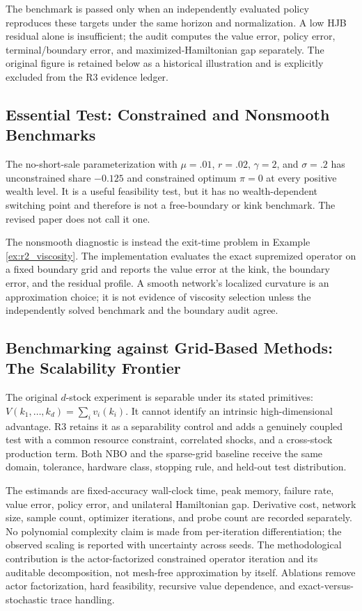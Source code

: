 \documentclass[ecta]{econsocart}
\theoremstyle{plain}
\theoremstyle{remark}
\begin{document}
The benchmark is passed only when an independently evaluated policy reproduces these targets under the same horizon and normalization. A low HJB residual alone is insufficient; the audit computes the value error, policy error, terminal/boundary error, and maximized-Hamiltonian gap separately. The original figure is retained below as a historical illustration and is explicitly excluded from the R3 evidence ledger.

\subsection{Essential Test: Constrained and Nonsmooth Benchmarks}
The no-short-sale parameterization with $\mu=.01$, $r=.02$, $\gamma=2$, and $\sigma=.2$ has unconstrained share $-0.125$ and constrained optimum $\pi=0$ at every positive wealth level. It is a useful feasibility test, but it has no wealth-dependent switching point and therefore is not a free-boundary or kink benchmark. The revised paper does not call it one.

The nonsmooth diagnostic is instead the exit-time problem in Example \ref{ex:r2_viscosity}. The implementation evaluates the exact supremized operator on a fixed boundary grid and reports the value error at the kink, the boundary error, and the residual profile. A smooth network's localized curvature is an approximation choice; it is not evidence of viscosity selection unless the independently solved benchmark and the boundary audit agree.

\subsection{Benchmarking against Grid-Based Methods: The Scalability Frontier}
The original $d$-stock experiment is separable under its stated primitives: $V(k_1,\ldots,k_d)=\sum_i v_i(k_i)$. It cannot identify an intrinsic high-dimensional advantage. R3 retains it as a separability control and adds a genuinely coupled test with a common resource constraint, correlated shocks, and a cross-stock production term. Both NBO and the sparse-grid baseline receive the same domain, tolerance, hardware class, stopping rule, and held-out test distribution.

The estimands are fixed-accuracy wall-clock time, peak memory, failure rate, value error, policy error, and unilateral Hamiltonian gap. Derivative cost, network size, sample count, optimizer iterations, and probe count are recorded separately. No polynomial complexity claim is made from per-iteration differentiation; the observed scaling is reported with uncertainty across seeds. The methodological contribution is the actor-factorized constrained operator iteration and its auditable decomposition, not mesh-free approximation by itself. Ablations remove actor factorization, hard feasibility, recursive value dependence, and exact-versus-stochastic trace handling.
\end{document}
